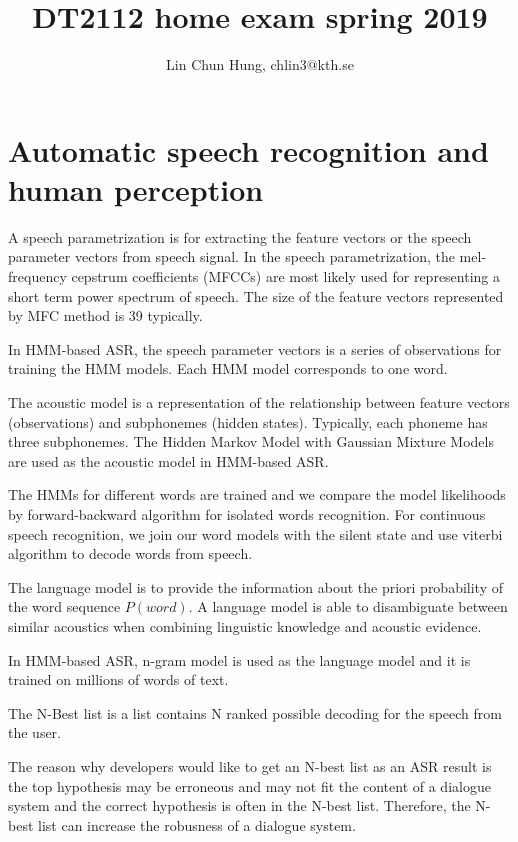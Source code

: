 \documentclass[12pt]{article}
\newenvironment{problem}[2][Problem]{\begin{trivlist}
\item[\hskip \labelsep {\bfseries #1}\hskip \labelsep {\bfseries #2.}]}{\end{trivlist}}
\begin{document}
\title{DT2112 home exam spring 2019}
\author{Lin Chun Hung, chlin3@kth.se}
\maketitle

\section{Automatic speech recognition and human perception}
\begin{problem}{1.1}
    A speech parametrization is for extracting the feature vectors or
    the speech parameter vectors from speech signal. In the speech parametrization,
    the mel-frequency cepstrum coefficients (MFCCs) are most likely used for
    representing a short term power spectrum of speech. The size of the
    feature vectors represented by MFC method is 39 typically.

    In HMM-based ASR, the speech parameter vectors is a series of observations
    for training the HMM models. Each HMM model corresponds to one word.

    The acoustic model is a representation of the relationship between feature
    vectors (observations) and subphonemes (hidden states).
    Typically, each phoneme has three subphonemes. The Hidden Markov Model with
    Gaussian Mixture Models are used as the acoustic model in HMM-based ASR.

    The HMMs for different words are trained and we compare the model likelihoods
    by forward-backward algorithm for isolated words recognition. For continuous
    speech recognition, we join our word models with the silent state and use viterbi
    algorithm to decode words from speech.

    The language model is to provide the information about the priori probability
    of the word sequence $P(word)$. A language model is able to disambiguate between
    similar acoustics when combining linguistic knowledge and acoustic evidence.

    In HMM-based ASR, n-gram model is used as the language model and it is trained
    on millions of words of text.

    The N-Best list is a list contains N ranked possible decoding for the speech
    from the user.

    The reason why developers would like to get an N-best list as an ASR result
    is the top hypothesis may be erroneous and may not fit the content of a
    dialogue system and the correct hypothesis is often in the N-best list.
    Therefore, the N-best list can increase the robusness of a dialogue system.
\end{problem}
\end{document}

